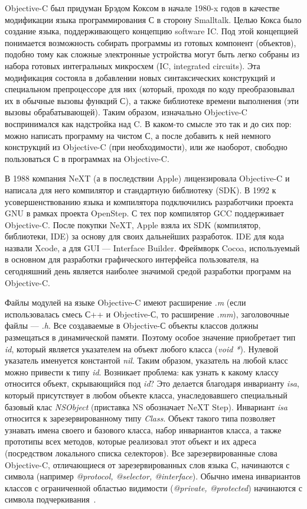 Objective-C был придуман Брэдом Коксом в начале 1980-x годов
в качестве модификации языка программирования С в сторону Smalltalk.
Целью Кокса было создание языка, поддерживающего концепцию software IC.
Под этой концепцией понимается возможность собирать программы из готовых
компонент (объектов), подобно тому как сложные электронные устройства могут быть
легко собраны из набора готовых интегральных микросхем (IC, integrated circuits).
Эта модификация состояла в добавлении новых синтаксических
конструкций и специальном препроцессоре для них (который, проходя по коду
преобразовывал их в обычные вызовы функций С),
а также библиотеке времени выполнения (эти вызовы обрабатывающей).
Таким образом, изначально Objective-C воспринимался как надстройка над C.
В каком-то смысле это так и до сих пор: можно написать программу на чистом С,
а после добавить к ней немного конструкций из Objective-C (при необходимости),
или же наоборот, свободно пользоваться С в программах на Objective-C.

В 1988 компания NeXT (а в последствии Apple)
лицензировала Objective-C и написала для него компилятор и
стандартную библиотеку (SDK).
В 1992 к усовершенствованию языка и компилятора подключились разработчики
проекта GNU в рамках проекта OpenStep. С тех пор компилятор GCC поддерживает Objective-C.
После покупки NeXT, Apple взяла их SDK (компилятор, библиотеки, IDE) за основу
для своих дальнейших разработок. IDE для кода назвали Xcode,
а для GUI --– Interface Builder.
Фреймворк Cocoa, используемый в основном для разработки графического интерфейса пользователя,
на сегодняшний день является наиболее значимой средой разработки программ на Objective-C.

Файлы модулей на языке Objective-C имеют расширение \textit{.m}
(если использовалась смесь С++ и Objective-С, то расширение \textit{.mm}),
заголовочные файлы --– \textit{.h}. Все создаваемые в Objective-С объекты классов
должны размещаться в динамической памяти. Поэтому особое значение приобретает
тип \textit{id}, который является указателем на объект любого класса (\textit{void *}).
Нулевой указатель именуется константой \textit{nil}.
Таким образом, указатель на любой класс можно привести к типу \textit{id}.
Возникает проблема: как узнать к какому классу относится объект,
скрывающийся под \textit{id}? Это делается благодаря инварианту \textit{isa},
который присутствует в любом объекте класса, унаследовавшего специальный
базовый клас \textit{NSObject} (приставка NS обозначает NeXT Step).
Инвариант \textit{isa} относится к зарезервированному типу \textit{Class}.
Объект такого типа позволяет узнавать имена своего и базового класса,
набор инвариантов класса, а также прототипы всех методов,
которые реализовал этот объект и их адреса (посредством локального списка селекторов).
Все зарезервированные слова Objective-C, отличающиеся от зарезервированных
слов языка С, начинаются с символа \@ (например \textit{@protocol, @selector, @interface}).
Обычно имена инвариантов классов с ограниченной
областью видимости (\textit{@private, @protected}) начинаются с
символа подчеркивания~\cite{objective_c_from_scratch, appledoc_ios}.



